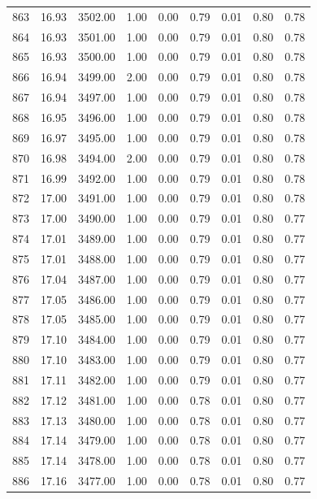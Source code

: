 \documentclass{article}\usepackage[]{graphicx}\usepackage[]{color}
\begin{document}
\begin{longtable}{rrrrrrrrr}
  863 & 16.93 & 3502.00 & 1.00 & 0.00 & 0.79 & 0.01 & 0.80 & 0.78 \\ 
  864 & 16.93 & 3501.00 & 1.00 & 0.00 & 0.79 & 0.01 & 0.80 & 0.78 \\ 
  865 & 16.93 & 3500.00 & 1.00 & 0.00 & 0.79 & 0.01 & 0.80 & 0.78 \\ 
  866 & 16.94 & 3499.00 & 2.00 & 0.00 & 0.79 & 0.01 & 0.80 & 0.78 \\ 
  867 & 16.94 & 3497.00 & 1.00 & 0.00 & 0.79 & 0.01 & 0.80 & 0.78 \\ 
  868 & 16.95 & 3496.00 & 1.00 & 0.00 & 0.79 & 0.01 & 0.80 & 0.78 \\ 
  869 & 16.97 & 3495.00 & 1.00 & 0.00 & 0.79 & 0.01 & 0.80 & 0.78 \\ 
  870 & 16.98 & 3494.00 & 2.00 & 0.00 & 0.79 & 0.01 & 0.80 & 0.78 \\ 
  871 & 16.99 & 3492.00 & 1.00 & 0.00 & 0.79 & 0.01 & 0.80 & 0.78 \\ 
  872 & 17.00 & 3491.00 & 1.00 & 0.00 & 0.79 & 0.01 & 0.80 & 0.78 \\ 
  873 & 17.00 & 3490.00 & 1.00 & 0.00 & 0.79 & 0.01 & 0.80 & 0.77 \\ 
  874 & 17.01 & 3489.00 & 1.00 & 0.00 & 0.79 & 0.01 & 0.80 & 0.77 \\ 
  875 & 17.01 & 3488.00 & 1.00 & 0.00 & 0.79 & 0.01 & 0.80 & 0.77 \\ 
  876 & 17.04 & 3487.00 & 1.00 & 0.00 & 0.79 & 0.01 & 0.80 & 0.77 \\ 
  877 & 17.05 & 3486.00 & 1.00 & 0.00 & 0.79 & 0.01 & 0.80 & 0.77 \\ 
  878 & 17.05 & 3485.00 & 1.00 & 0.00 & 0.79 & 0.01 & 0.80 & 0.77 \\ 
  879 & 17.10 & 3484.00 & 1.00 & 0.00 & 0.79 & 0.01 & 0.80 & 0.77 \\ 
  880 & 17.10 & 3483.00 & 1.00 & 0.00 & 0.79 & 0.01 & 0.80 & 0.77 \\ 
  881 & 17.11 & 3482.00 & 1.00 & 0.00 & 0.79 & 0.01 & 0.80 & 0.77 \\ 
  882 & 17.12 & 3481.00 & 1.00 & 0.00 & 0.78 & 0.01 & 0.80 & 0.77 \\ 
  883 & 17.13 & 3480.00 & 1.00 & 0.00 & 0.78 & 0.01 & 0.80 & 0.77 \\ 
  884 & 17.14 & 3479.00 & 1.00 & 0.00 & 0.78 & 0.01 & 0.80 & 0.77 \\ 
  885 & 17.14 & 3478.00 & 1.00 & 0.00 & 0.78 & 0.01 & 0.80 & 0.77 \\ 
  886 & 17.16 & 3477.00 & 1.00 & 0.00 & 0.78 & 0.01 & 0.80 & 0.77 \\ 

\end{longtable}
\end{document}
